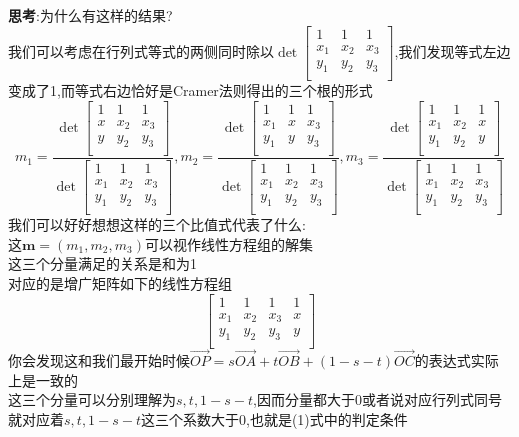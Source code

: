 \documentclass{article}
\newcommand{\ve}{\boldsymbol}
\begin{document}
\begin{CJK}{UTF8}{gkai}
\textbf{思考}:为什么有这样的结果?\\
我们可以考虑在行列式等式的两侧同时除以$\det\begin{bmatrix}
    1&1&1\\
    x_1&x_2&x_3\\
    y_1&y_2&y_3\\
\end{bmatrix}$,我们发现等式左边变成了1,而等式右边恰好是Cramer法则得出的三个根的形式\[m_1=\dfrac{\det\begin{bmatrix}
    1&1&1\\
    x&x_2&x_3\\
    y&y_2&y_3\\
\end{bmatrix}}{\det\begin{bmatrix}
    1&1&1\\
    x_1&x_2&x_3\\
    y_1&y_2&y_3\\
\end{bmatrix}},m_2=\dfrac{\det\begin{bmatrix}
    1&1&1\\
    x_1&x&x_3\\
    y_1&y&y_3\\
\end{bmatrix}}{\det\begin{bmatrix}
    1&1&1\\
    x_1&x_2&x_3\\
    y_1&y_2&y_3\\
\end{bmatrix}},m_3=\dfrac{\det\begin{bmatrix}
    1&1&1\\
    x_1&x_2&x\\
    y_1&y_2&y\\
\end{bmatrix}}{\det\begin{bmatrix}
    1&1&1\\
    x_1&x_2&x_3\\
    y_1&y_2&y_3\\
\end{bmatrix}}\]
我们可以好好想想这样的三个比值式代表了什么:\\
这$\ve{m}=(m_1,m_2,m_3)$可以视作线性方程组的解集\\
这三个分量满足的关系是和为1\\
对应的是增广矩阵如下的线性方程组
\[\begin{bmatrix}
    1&1&1&1\\
    x_1&x_2&x_3&x\\
    y_1&y_2&y_3&y\\
\end{bmatrix}\]
你会发现这和我们最开始时候$\overrightarrow{OP}=s\overrightarrow{OA}+t\overrightarrow{OB}+(1-s-t)\overrightarrow{OC}$的表达式实际上是一致的\\
这三个分量可以分别理解为$s,t,1-s-t$,因而分量都大于0或者说对应行列式同号就对应着$s,t,1-s-t$这三个系数大于0,也就是(1)式中的判定条件



\end{CJK}
\end{document}
